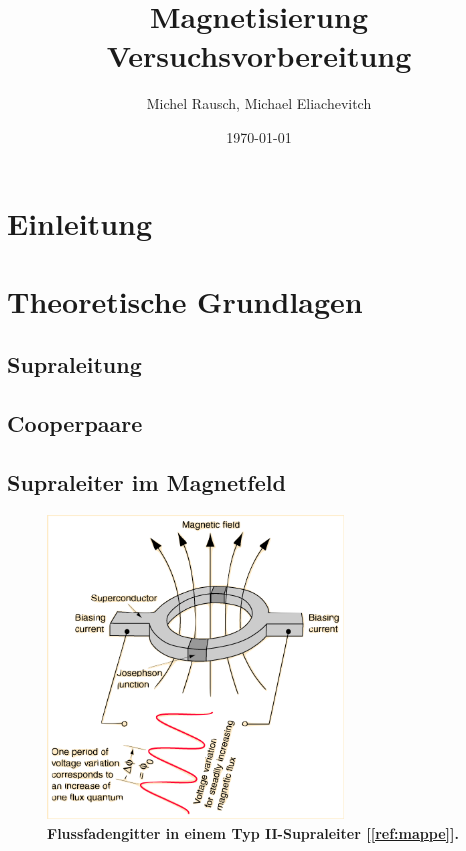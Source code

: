 \documentclass[a4paper,ngerman]{scrartcl}
\title{Magnetisierung\\Versuchsvorbereitung}
\date{\today}
\author{Michel Rausch, Michael Eliachevitch}
\begin{document}
\maketitle
\tableofcontents
\newpage

\section{Einleitung}



\section{Theoretische Grundlagen}

\subsection{Supraleitung}


\subsection{Cooperpaare}


\subsection{Supraleiter im Magnetfeld}


\begin{figure}
\centering
\includegraphics[width=0.7\textwidth]{abbildungen/squide.png}
\caption[Versuchsplatz]{\textbf{Flussfadengitter in einem Typ II-Supraleiter [\ref{ref:mappe}].}}
\label{fig:typII}
\end{figure}
\end{document}
